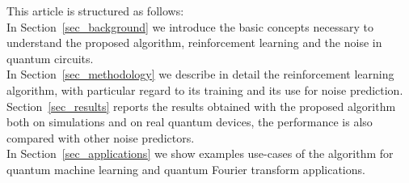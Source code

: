 \documentclass[sn-basic]{sn-jnl} %
\begin{document}
\noindent
This article is structured as follows:\\
In Section~\ref{sec_background} we introduce the basic concepts necessary to understand the proposed algorithm, reinforcement learning and the noise in quantum circuits. \\
In Section~\ref{sec_methodology} we describe in detail the reinforcement learning algorithm, with particular regard to its training and its use for noise prediction. \\
Section~\ref{sec_results} reports the results obtained with the proposed algorithm both on simulations and on real quantum devices, the performance is also compared with other noise predictors. \\
In Section~\ref{sec_applications} we show examples use-cases of the algorithm for quantum machine learning and quantum Fourier transform applications.


\end{document}
